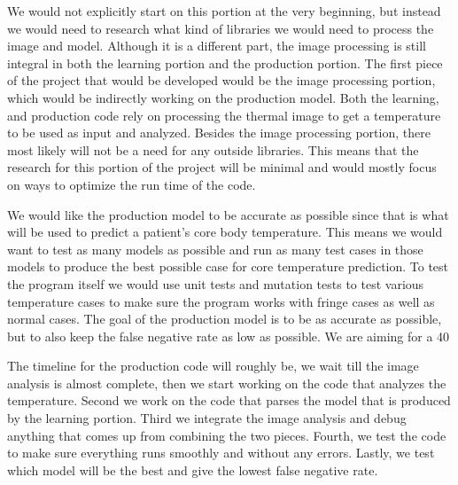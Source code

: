 ﻿\documentclass[onecolumn, draftclsnofoot,10pt, compsoc]{IEEEtran}
\begin{document}
We would not explicitly start on this portion at the very beginning, but instead we would need to research what kind of libraries we would need to process the image and model. Although it is a different part, the image processing is still integral in both the learning portion and the production portion. The first piece of the project that would be developed would be the image processing portion, which would be indirectly working on the production model. Both the learning, and production code rely on processing the thermal image to get a temperature to be used as input and analyzed. Besides the image processing portion, there most likely will not be a need for any outside libraries. This means that the research for this portion of the project will be minimal and would mostly focus on ways to optimize the run time of the code.

We would like the production model to be accurate as possible since that is what will be used to predict a patient's core body temperature. This means we would want to test as many models as possible and run as many test cases in those models to produce the best possible case for core temperature prediction. To test the program itself we would use unit tests and mutation tests to test various temperature cases to make sure the program works with fringe cases as well as normal cases. The goal of the production model is to be as accurate as possible, but to also keep the false negative rate as low as possible. We are aiming for a 40%

The timeline for the production code will roughly be, we wait till the image analysis is almost complete, then we start working on the code that analyzes the temperature. Second we work on the code that parses the model that is produced by the learning portion. Third we integrate the image analysis and debug anything that comes up from combining the two pieces. Fourth, we test the code to make sure everything runs smoothly and without any errors. Lastly, we test which model will be the best and give the lowest false negative rate.
\end{document}
